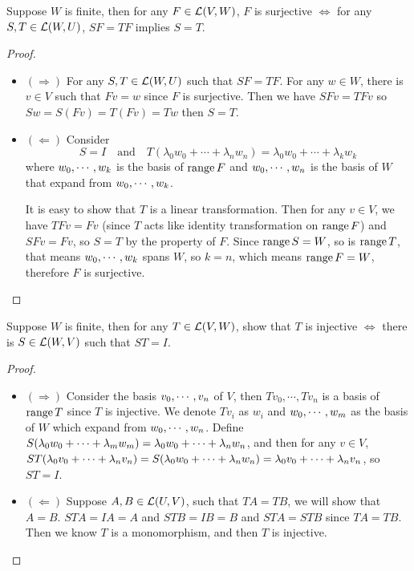 \documentclass[../main.tex]{subfiles}
\begin{document}
\begin{exercise*}
  Suppose $W$ is finite, then for any $F \in \LT(V, W)$, $F$ is surjective $\iff$ for any $S, T \in \LT(W, U)$, $SF = TF$ implies $S = T$.
\end{exercise*}
\begin{proof}
  ~
  \begin{itemize}
    \item $(\Rightarrow)$ For any $S, T \in \LT(W, U)$ such that $SF = TF$. For any $w \in W$,
          there is $v \in V$ such that $Fv = w$ since $F$ is surjective. Then we have
          $SFv = TFv$ so $Sw = S(Fv) = T(Fv) = Tw$ then $S = T$.
    \item $(\Leftarrow)$ Consider
          \[
          S = I \quad \text{and} \quad T(\lambda_0w_0 + \cdots + \lambda_n w_n) = \lambda_0w_0 + \cdots + \lambda_kw_k
          \]
          where $\join{w}{k}$ is the basis of $\rangev F$ and
          $\join{w}{n}$ is the basis of $W$ that expand from $\join{w}{k}$.

          It is easy to show that $T$ is a linear transformation. Then for any $v \in V$, we have
          $TFv = Fv$ (since $T$ acts like identity transformation on $\rangev F$) and $SFv = Fv$,
          so $S = T$ by the property of $F$. Since $\rangev S = W$, so is $\rangev T$, that means
          $\join{w}{k}$ spans $W$, so $k = n$, which means $\rangev F = W$, therefore $F$ is surjective.
  \end{itemize}
\end{proof}

\setcounter{exercise}{18}
\begin{exercise}
  Suppose $W$ is finite, then for any $T \in \LT(V, W)$,
  show that $T$ is injective $\iff$ there is $S \in \LT(W, V)$ such that $ST = I$.
\end{exercise}
\begin{proof}
  ~
  \begin{itemize}
    \item $(\Rightarrow)$ Consider the basis $\join{v}{n}$ of $V$, then $Tv_0, \cdots, Tv_n$
          is a basis of $\rangev T$ since $T$ is injective. We denote $Tv_i$ as $w_i$
          and $\join{w}{m}$ as the basis of $W$ which expand from $\join{w}{n}$.
          Define $S(\joinp[+]{\lambda}{w}{m}) = \joinp[+]{\lambda}{w}{n}$, and then for any
          $v \in V$, $ST(\joinp[+]{\lambda}{v}{n}) = S(\lambda_0w_0 + \cdots + \lambda_nw_n) = \joinp[+]{\lambda}{v}{n}$,
          so $ST = I$.
    \item $(\Leftarrow)$ Suppose $A, B \in \LT(U, V)$, such that $TA = TB$, we will show that $A = B$.
          $STA = IA = A$ and $STB = IB = B$ and $STA = STB$ since $TA = TB$.
          Then we know $T$ is a monomorphism, and then $T$ is injective.
  \end{itemize}
\end{proof}
\end{document}
